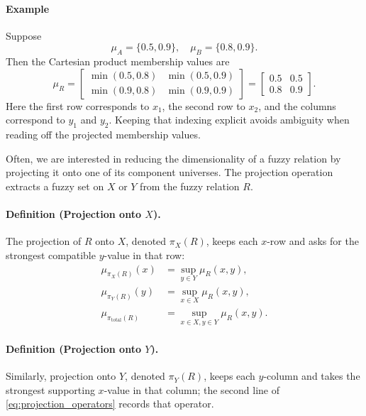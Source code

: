 \paragraph{Example}

Suppose
\[
    \mu_A = \{0.5, 0.9\}, \quad \mu_B = \{0.8, 0.9\}.
\]
Then the Cartesian product membership values are
\[
    \mu_R = \begin{bmatrix}
    \min(0.5,0.8) & \min(0.5,0.9) \\
    \min(0.9,0.8) & \min(0.9,0.9)
    \end{bmatrix} = \begin{bmatrix}
    0.5 & 0.5 \\
    0.8 & 0.9
    \end{bmatrix}.
\]
Here the first row corresponds to \(x_1\), the second row to \(x_2\), and the columns correspond to \(y_1\) and \(y_2\). Keeping that indexing explicit avoids ambiguity when reading off the projected membership values.

Often, we are interested in reducing the dimensionality of a fuzzy relation by projecting it onto one of its component universes. The projection operation extracts a fuzzy set on \( X \) or \( Y \) from the fuzzy relation \( R \).

\paragraph{Definition (Projection onto $X$).}
The projection of \( R \) onto \( X \), denoted \( \pi_X(R) \), keeps each \(x\)-row and asks for the strongest compatible \(y\)-value in that row:
\begin{equation}
    \begin{aligned}
        \mu_{\pi_X(R)}(x) &= \sup_{y \in Y} \mu_R(x, y),\\
        \mu_{\pi_Y(R)}(y) &= \sup_{x \in X} \mu_R(x, y),\\
        \mu_{\pi_{\text{total}}(R)} &= \sup_{x \in X, y \in Y} \mu_R(x, y).
    \end{aligned}
    \label{eq:projection_operators}
\end{equation}


\paragraph{Definition (Projection onto $Y$).}
Similarly, projection onto \( Y \), denoted \( \pi_Y(R) \), keeps each \(y\)-column and takes the strongest supporting \(x\)-value in that column; the second line of \eqref{eq:projection_operators} records that operator.


